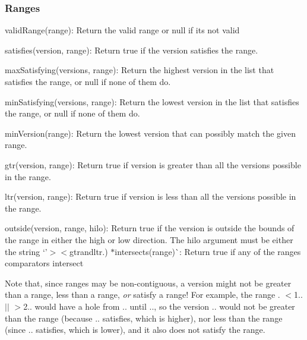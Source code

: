 \subsubsection*{Ranges}


\begin{DoxyItemize}
\item {\ttfamily valid\+Range(range)}\+: Return the valid range or null if it\textquotesingle{}s not valid
\item {\ttfamily satisfies(version, range)}\+: Return true if the version satisfies the range.
\item {\ttfamily max\+Satisfying(versions, range)}\+: Return the highest version in the list that satisfies the range, or {\ttfamily null} if none of them do.
\item {\ttfamily min\+Satisfying(versions, range)}\+: Return the lowest version in the list that satisfies the range, or {\ttfamily null} if none of them do.
\item {\ttfamily min\+Version(range)}\+: Return the lowest version that can possibly match the given range.
\item {\ttfamily gtr(version, range)}\+: Return {\ttfamily true} if version is greater than all the versions possible in the range.
\item {\ttfamily ltr(version, range)}\+: Return {\ttfamily true} if version is less than all the versions possible in the range.
\item {\ttfamily outside(version, range, hilo)}\+: Return true if the version is outside the bounds of the range in either the high or low direction. The {\ttfamily hilo} argument must be either the string `'$>$\textquotesingle{}$<$gtr{\ttfamily and}ltr{\ttfamily .) $\ast$}intersects(range)\`{}\+: Return true if any of the ranges comparators intersect
\end{DoxyItemize}

Note that, since ranges may be non-\/contiguous, a version might not be greater than a range, less than a range, {\itshape or} satisfy a range! For example, the range {. $<$1.. $\vert$$\vert$ $>$2..} would have a hole from {..} until {..}, so the version {..} would not be greater than the range (because {..} satisfies, which is higher), nor less than the range (since {..} satisfies, which is lower), and it also does not satisfy the range.

